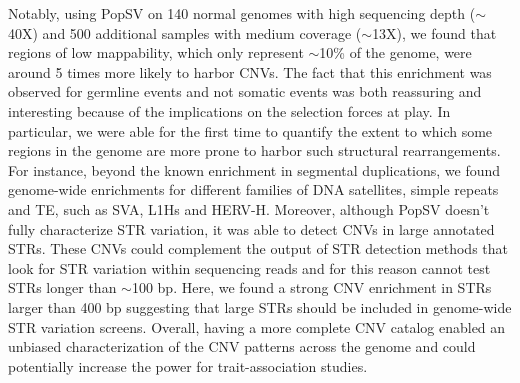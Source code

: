Notably, using {\sf PopSV} on 140 normal genomes with high sequencing depth ($\sim$40X) and 500 additional samples with medium coverage ($\sim$13X), we found that regions of low mappability, which only represent $\sim$10\% of the genome, were around 5 times more likely to harbor CNVs. The fact that this enrichment was observed for germline events and not somatic events was both reassuring and interesting because of the implications on the selection forces at play. In particular, we were able for the first time to quantify the extent to which some regions in the genome are more prone to harbor such structural rearrangements.
For instance, beyond the known enrichment in segmental duplications, we found genome-wide enrichments for different families of DNA satellites, simple repeats and TE, such as SVA, L1Hs and HERV-H.
Moreover, although {\sf PopSV} doesn't fully characterize STR variation, it was able to detect CNVs in large annotated STRs.
These CNVs could complement the output of STR detection methods that look for STR variation within sequencing reads and for this reason cannot test STRs longer than $\sim$100 bp.
Here, we found a strong CNV enrichment in STRs larger than 400 bp suggesting that large STRs should be included in genome-wide STR variation screens.
Overall, having a more complete CNV catalog enabled an unbiased characterization of the CNV patterns across the genome and could potentially increase the power for trait-association studies.

